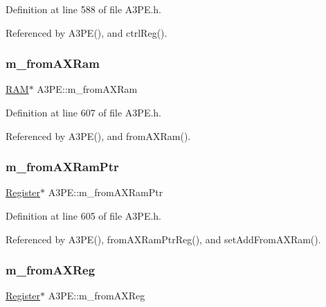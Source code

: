 Definition at line 588 of file A3\+P\+E.\+h.



Referenced by A3\+P\+E(), and ctrl\+Reg().

\mbox{\label{classA3PE_a91d3dd3e87e2c948dd67cb82a63d3858}} 
\subsubsection{\texorpdfstring{m\+\_\+from\+A\+X\+Ram}{m\_fromAXRam}}
{\footnotesize\ttfamily \hyperlink{classRAM}{R\+AM}$\ast$ A3\+P\+E\+::m\+\_\+from\+A\+X\+Ram\hspace{0.3cm}{\ttfamily [private]}}



Definition at line 607 of file A3\+P\+E.\+h.



Referenced by A3\+P\+E(), and from\+A\+X\+Ram().

\mbox{\label{classA3PE_a27ae9467bc128e46dd80443245df096a}} 
\subsubsection{\texorpdfstring{m\+\_\+from\+A\+X\+Ram\+Ptr}{m\_fromAXRamPtr}}
{\footnotesize\ttfamily \hyperlink{classRegister}{Register}$\ast$ A3\+P\+E\+::m\+\_\+from\+A\+X\+Ram\+Ptr\hspace{0.3cm}{\ttfamily [private]}}



Definition at line 605 of file A3\+P\+E.\+h.



Referenced by A3\+P\+E(), from\+A\+X\+Ram\+Ptr\+Reg(), and set\+Add\+From\+A\+X\+Ram().

\mbox{\label{classA3PE_acbfe708ac0a81243959c96124f192b9e}} 
\subsubsection{\texorpdfstring{m\+\_\+from\+A\+X\+Reg}{m\_fromAXReg}}
{\footnotesize\ttfamily \hyperlink{classRegister}{Register}$\ast$ A3\+P\+E\+::m\+\_\+from\+A\+X\+Reg\hspace{0.3cm}{\ttfamily [private]}}



